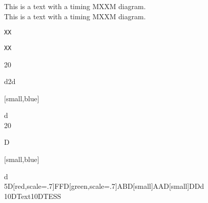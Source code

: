 \documentclass{article}
\begin{document}
\noindent
This is a text with a timing MXXM diagram.\\
This is a text with a timing MXXM diagram.


\def\testmycount{\Hexadecimal{mycount}\addtocounter{mycount}{+1}}
\def\gobble#1{}

\texttt\bgroup XX\egroup

\DeclareRobustCommand\testtt[1]{\texttt{#1}}
\testtt\bgroup XX\egroup

\noindent
\begin{tikztimingexampletable}
  [d]20{d2d{[small,blue]{\addtocounter{mycount}{+1}}}}d \\
 [D]20{D{[small,blue]\addtocounter{mycount}{+1}}}d \\
 5{D{[red,scale=.7]FF}}D{[green,scale=.7]AB}D{[small]AA}D{[small]DD}d \\
 10D{Text}10D{TESS} \\
\end{tikztimingexampletable}
\end{document}
